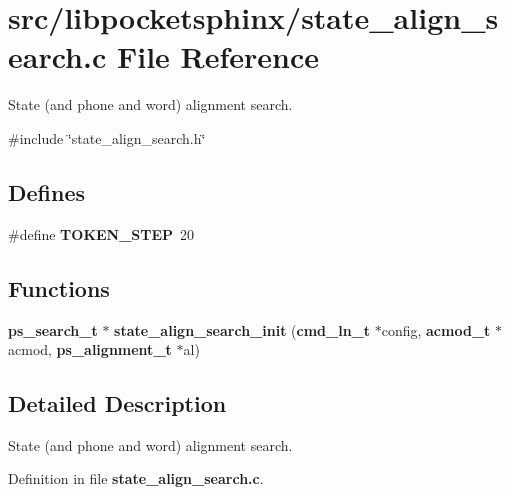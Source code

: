 \section{src/libpocketsphinx/state\-\_\-align\-\_\-search.c \-File \-Reference}
\label{state__align__search_8c}


\-State (and phone and word) alignment search.  


{\ttfamily \#include \char`\"{}state\-\_\-align\-\_\-search.\-h\char`\"{}}\*
\subsection*{\-Defines}
\begin{DoxyCompactItemize}
\item 
\#define {\bfseries \-T\-O\-K\-E\-N\-\_\-\-S\-T\-E\-P}~20\label{state__align__search_8c_a197a0cf5b150b88b0e3043fd78550931}

\end{DoxyCompactItemize}
\subsection*{\-Functions}
\begin{DoxyCompactItemize}
\item 
{\bf ps\-\_\-search\-\_\-t} $\ast$ {\bfseries state\-\_\-align\-\_\-search\-\_\-init} ({\bf cmd\-\_\-ln\-\_\-t} $\ast$config, {\bf acmod\-\_\-t} $\ast$acmod, {\bf ps\-\_\-alignment\-\_\-t} $\ast$al)\label{state__align__search_8c_a7263b71e3838f0689963439c8b695e15}

\end{DoxyCompactItemize}


\subsection{\-Detailed \-Description}
\-State (and phone and word) alignment search. 

\-Definition in file {\bf state\-\_\-align\-\_\-search.\-c}.

